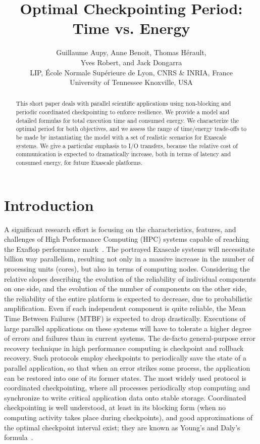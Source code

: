 \documentclass[a4paper]{article}
\author{Guillaume Aupy, Anne Benoit, Thomas H\'erault,\\
 Yves Robert, and Jack Dongarra\\
  LIP,  \'Ecole Normale Sup\'erieure de Lyon, CNRS \& INRIA, France\\
  University of Tennessee Knoxville, USA
}
\title{Optimal Checkpointing Period: Time vs. Energy}
\begin{document}
\maketitle

\begin{abstract}
This short paper deals with parallel scientific applications using non-blocking and periodic coordinated checkpointing
to enforce resilience. We provide a model and detailed formulas for total execution time
and consumed energy. We characterize the optimal period for both objectives, and we assess
the range of time/energy trade-offs to be made by instantiating the model 
with a set of realistic scenarios for Exascale systems. We give a particular emphasis to I/O transfers,
because the relative cost of communication is
expected to dramatically increase, both in terms of latency and consumed energy, for future Exascale platforms.
\end{abstract}


\section{Introduction}
\label{sec.intro}

A significant research effort is focusing on the
characteristics, features, and challenges of High Performance
Computing (HPC) systems capable of reaching the Exaflop performance
mark~\cite{IESP-Exascale,DARPA}. The portrayed Exascale systems will
necessitate billion way parallelism, resulting not only in a massive
increase in the number of processing units (cores), but also in terms
of computing nodes. Considering the relative slopes describing the evolution of the
reliability of individual components on one side, and the evolution of
the number of components on the other side, the reliability of the
entire platform is expected to decrease, due to probabilistic
amplification.  Even if each independent component is quite reliable, the Mean Time Between Failures (MTBF) is expected to drop drastically. Executions of large parallel applications on these
systems will have to tolerate a higher degree of errors and failures
than in current systems. The de-facto general-purpose error recovery technique in high performance computing 
is checkpoint and rollback recovery. Such protocols employ checkpoints to periodically save 
the state of a parallel application, so that when an error strikes some process, 
the application can be restored into one of its former states. The most widely used protocol is coordinated 
checkpointing, where all processes periodically stop computing and synchronize to write critical application
data onto stable
storage. Coordinated 
checkpointing is well understood, at least in its blocking form (when no computing activity takes place
during checkpoints), and good
approximations of the optimal checkpoint interval exist; they are known as
Young's and Daly's formula~\cite{young74,daly04}. 
\end{document}
